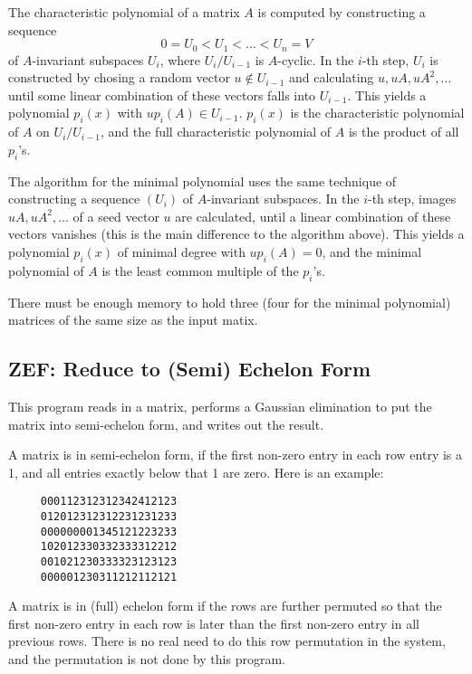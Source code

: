 \Implementation
The characteristic polynomial of a matrix $A$ is computed by
constructing a sequence
\[
	0=U_0<U_1<\ldots<U_n=V
\]
of $A$-invariant subspaces $U_i$, where $U_i/U_{i-1}$ is $A$-cyclic.
In the $i$-th step, $U_i$ is constructed by chosing a random vector
$u\not\in U_{i-1}$ and calculating $u,uA,uA^2,\ldots$ until some
linear combination of these vectors falls into $U_{i-1}$. This yields
a polynomial $p_i(x)$ with $up_i(A)\in U_{i-1}$. $p_i(x)$ is the
characteristic polynomial of $A$ on $U_i/U_{i-1}$, and the full
characteristic polynomial of $A$ is the product of all $p_i$'s.

The algorithm for the minimal polynomial uses the same technique of
constructing a sequence $(U_i)$ of $A$-invariant subspaces. In the
$i$-th step, images $uA,uA^2,\ldots$ of a seed vector $u$ are
calculated, until a linear combination of these vectors vanishes
(this is the main difference to the algorithm above). This yields a
polynomial $p_i(x)$ of minimal degree with $up_i(A)=0$, and the
minimal polynomial of $A$ is the least common multiple of the
$p_i$'s.



\Limits
There must be enough memory to hold three (four for the minimal
polynomial) matrices of the same size as the input matix.



\subsection{ZEF: Reduce to (Semi) Echelon Form}
\Syntax
{}

\Description
This program reads in a matrix, performs a Gaussian elimination to put
the matrix into semi-echelon form, and writes out the result.

A matrix is in semi-echelon form, if the first non-zero entry in each
row entry is a 1, and all entries exactly below that 1 are zero. Here
is an example:
\begin{center}
\begin{verbatim}
     000112312312342412123
     012012312312231231233
     000000001345121223233
     102012330332333312212
     001021230333323123123
     000001230311212112121
\end{verbatim}
\end{center}
A matrix is in (full) echelon form if the rows are further permuted so
that the first non-zero entry in each row is later than the first
non-zero entry in all previous rows. There is no real need to do this
row permutation in the {\MeatAxe} system, and the permutation is not
done by this program.

